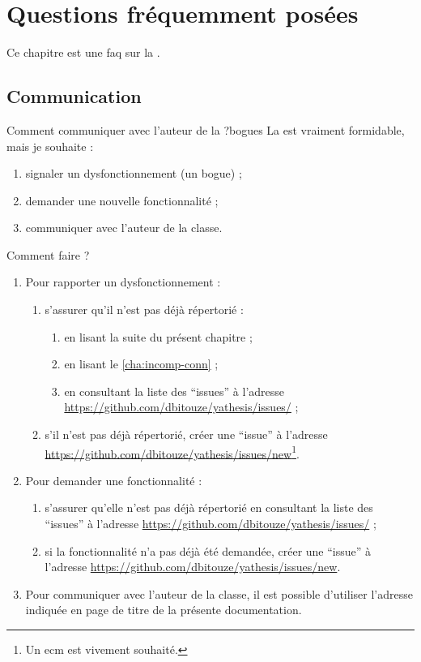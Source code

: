\chapter{Questions fréquemment posées}\label{cha:faq}

Ce chapitre est une \gls{faq}  sur la \yatcl{}.

\section{Communication}
\label{sec:communication}

\begin{dbfaq}{Comment communiquer avec l'auteur de la \yatcl{} ?}{bogues}
  La \yatcl{} est vraiment formidable, mais je souhaite :
  \begin{enumerate}
  \item signaler un dysfonctionnement (un bogue) ;
  \item demander une nouvelle fonctionnalité ;
  \item communiquer avec l'auteur de la classe.
  \end{enumerate}
  Comment faire ?
  \tcblower
  \begin{enumerate}
  \item Pour rapporter un dysfonctionnement :
    \begin{enumerate}
    \item s'assurer qu'il n'est pas déjà répertorié :
      \begin{enumerate}
      \item en lisant la suite du présent chapitre ;
      \item en lisant le \vref{cha:incomp-conn} ;
      \item en consultant la liste des \enquote{issues} à l'adresse
        \url{https://github.com/dbitouze/yathesis/issues/} ;
      \end{enumerate}
    \item s'il n'est pas déjà répertorié, créer une \enquote{issue} à l'adresse
      \url{https://github.com/dbitouze/yathesis/issues/new}\footnote{Un
        \gls{ecm} est vivement souhaité.}.
    \end{enumerate}
  \item Pour demander une fonctionnalité :
    \begin{enumerate}
    \item s'assurer qu'elle n'est pas déjà répertorié en
      consultant la liste des \enquote{issues} à l'adresse
      \url{https://github.com/dbitouze/yathesis/issues/} ;
    \item si la fonctionnalité n'a pas déjà été demandée, créer une
      \enquote{issue} à l'adresse
      \url{https://github.com/dbitouze/yathesis/issues/new}.
    \end{enumerate}
  \item Pour communiquer avec l'auteur de la classe, il est possible d'utiliser
    l'adresse indiquée en page de titre de la présente documentation.
  \end{enumerate}
\end{dbfaq}

